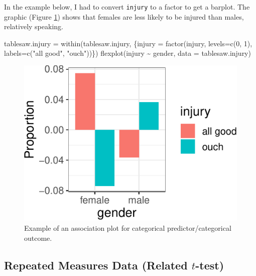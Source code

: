 \documentclass[
  english,
  man]{apa6}
\newenvironment{Shaded}{\begin{snugshade}}{\end{snugshade}}
\newcommand{\AttributeTok}[1]{\textcolor[rgb]{0.77,0.63,0.00}{#1}}
\newcommand{\DecValTok}[1]{\textcolor[rgb]{0.00,0.00,0.81}{#1}}
\newcommand{\FunctionTok}[1]{\textcolor[rgb]{0.00,0.00,0.00}{#1}}
\newcommand{\NormalTok}[1]{#1}
\newcommand{\OtherTok}[1]{\textcolor[rgb]{0.56,0.35,0.01}{#1}}
\newcommand{\SpecialCharTok}[1]{\textcolor[rgb]{0.00,0.00,0.00}{#1}}
\newcommand{\StringTok}[1]{\textcolor[rgb]{0.31,0.60,0.02}{#1}}
\begin{document}
In the example below, I had to convert \texttt{injury} to a factor to get a barplot. The graphic (Figure \ref{fig:association}) shows that females are less likely to be injured than males, relatively speaking.

\small

\begin{Shaded}
\begin{Highlighting}[]
\NormalTok{tablesaw.injury }\OtherTok{=} \FunctionTok{within}\NormalTok{(tablesaw.injury, \{injury }\OtherTok{=} \FunctionTok{factor}\NormalTok{(injury, }
                    \AttributeTok{levels=}\FunctionTok{c}\NormalTok{(}\DecValTok{0}\NormalTok{, }\DecValTok{1}\NormalTok{), }\AttributeTok{labels=}\FunctionTok{c}\NormalTok{(}\StringTok{"all good"}\NormalTok{, }\StringTok{"ouch"}\NormalTok{))\})}
\FunctionTok{flexplot}\NormalTok{(injury }\SpecialCharTok{\textasciitilde{}}\NormalTok{ gender, }\AttributeTok{data =}\NormalTok{ tablesaw.injury)}
\end{Highlighting}
\end{Shaded}

\begin{figure}
\centering
\includegraphics{flexplot_psychmeth_files/figure-latex/association-1.pdf}
\caption{\label{fig:association}Example of an association plot for categorical predictor/categorical outcome.\label{fig:association}}
\end{figure}

\normalsize

\hypertarget{repeated-measures-data-related-t-test}{%
\subsection{\texorpdfstring{Repeated Measures Data (Related \(t\)-test)}{Repeated Measures Data (Related t-test)}}\label{repeated-measures-data-related-t-test}}
\end{document}
